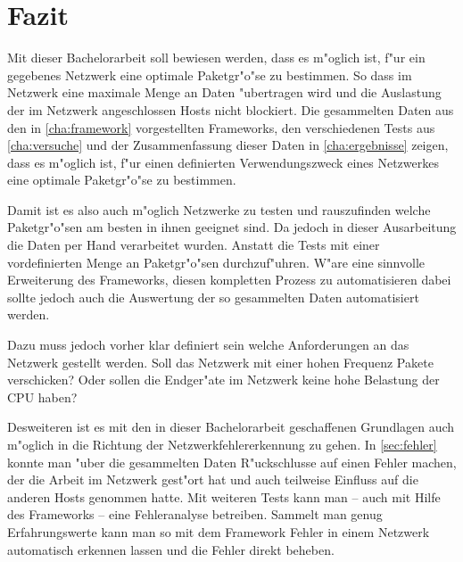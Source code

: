 \chapter{Fazit}
\label{cha:ausblick}

Mit dieser Bachelorarbeit soll bewiesen werden, dass es m"oglich ist, %
f"ur ein gegebenes Netzwerk eine optimale Paketgr"o"se zu bestimmen. %
So dass im Netzwerk eine maximale Menge an Daten "ubertragen wird und %
die Auslastung der im Netzwerk angeschlossen Hosts nicht blockiert. %
Die gesammelten Daten aus den in \cref{cha:framework} vorgestellten Frameworks, %
den verschiedenen Tests aus \cref{cha:versuche} und der Zusammenfassung dieser Daten in %
\cref{cha:ergebnisse} zeigen, dass es m"oglich ist, f"ur einen definierten Verwendungszweck eines %
Netzwerkes eine optimale Paketgr"o"se zu bestimmen.

Damit ist es also auch m"oglich Netzwerke zu testen und rauszufinden welche %
Paketgr"o"sen am besten in ihnen geeignet sind. Da jedoch in dieser Ausarbeitung die Daten %
per Hand verarbeitet wurden. Anstatt die Tests mit einer vordefinierten Menge an Paketgr"o"sen %
durchzuf"uhren. W"are eine sinnvolle Erweiterung des Frameworks, diesen %
kompletten Prozess zu automatisieren dabei sollte jedoch auch die Auswertung der %
so gesammelten Daten automatisiert werden. %

Dazu muss jedoch vorher klar definiert sein welche Anforderungen an das Netzwerk gestellt werden. %
Soll das Netzwerk mit einer hohen Frequenz Pakete verschicken? Oder sollen die Endger"ate im Netzwerk %
keine hohe Belastung der CPU haben?

Desweiteren ist es mit den in dieser Bachelorarbeit geschaffenen Grundlagen auch m"oglich %
in die Richtung der Netzwerkfehlererkennung zu gehen. In \cref{sec:fehler} konnte man %
"uber die gesammelten Daten R"uckschlusse auf einen Fehler machen, %
der die Arbeit im Netzwerk gest"ort hat und auch teilweise Einfluss auf die anderen Hosts genommen hatte. %
Mit weiteren Tests kann man -- auch mit Hilfe des Frameworks -- eine Fehleranalyse betreiben. %
Sammelt man genug Erfahrungswerte kann man so mit dem Framework Fehler in einem Netzwerk %
automatisch erkennen lassen und die Fehler direkt beheben. %


